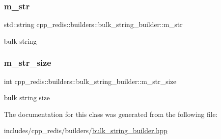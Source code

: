 \subsubsection{\texorpdfstring{m\+\_\+str}{m\_str}}
{\footnotesize\ttfamily std\+::string cpp\+\_\+redis\+::builders\+::bulk\+\_\+string\+\_\+builder\+::m\+\_\+str\hspace{0.3cm}{\ttfamily [private]}}

bulk string \mbox{\label{classcpp__redis_1_1builders_1_1bulk__string__builder_afac58a56edceb0ed8b5581fc53907f58}} 
\subsubsection{\texorpdfstring{m\+\_\+str\+\_\+size}{m\_str\_size}}
{\footnotesize\ttfamily int cpp\+\_\+redis\+::builders\+::bulk\+\_\+string\+\_\+builder\+::m\+\_\+str\+\_\+size\hspace{0.3cm}{\ttfamily [private]}}

bulk string size 

The documentation for this class was generated from the following file\+:\begin{DoxyCompactItemize}
\item 
includes/cpp\+\_\+redis/builders/\hyperlink{bulk__string__builder_8hpp}{bulk\+\_\+string\+\_\+builder.\+hpp}\end{DoxyCompactItemize}
